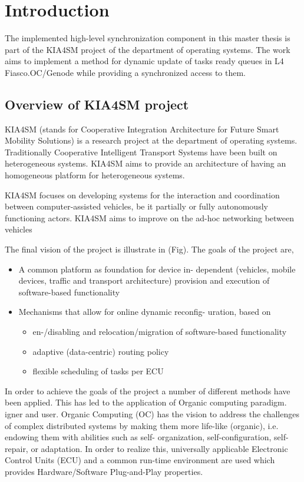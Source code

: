 \chapter{Introduction}
The implemented high-level synchronization component in this master thesis is part of the KIA4SM project of the department of operating systems. The work aims to implement a method for dynamic update of tasks ready queues in L4 Fiasco.OC/Genode while providing a synchronized access to them.



  

\section{Overview of KIA4SM project}

KIA4SM (stands for Cooperative Integration Architecture for Future Smart Mobility Solutions) is a research project at the department of operating systems. Traditionally Cooperative Intelligent Transport Systems have been built on heterogeneous systems. KIA4SM aims to provide an architecture of having an homogeneous platform for heterogeneous systems. 

KIA4SM focuses on developing systems for the interaction and coordination between computer-assisted vehicles, be it partially or fully autonomously functioning actors.  KIA4SM aims to improve on the ad-hoc networking between vehicles

The final vision of the project is illustrate in (Fig). The goals of the project are,

\begin{itemize}
\item A common platform as foundation for device in-
dependent (vehicles, mobile devices, traffic and
transport architecture) provision and execution of
software-based functionality
\item Mechanisms that allow for online dynamic reconfig-
uration, based on
\begin{itemize}
\item en-/disabling and relocation/migration of
software-based functionality
\item adaptive (data-centric) routing policy
\item flexible scheduling of tasks per ECU
\end{itemize}
\end{itemize}

In order to achieve the goals of the project a number of different methods have been applied. This has led to the application of Organic computing paradigm. igner and user.
Organic Computing (OC) has the vision to address the
challenges of complex distributed systems by making them more
life-like (organic), i.e. endowing them with abilities such as self-
organization, self-configuration, self-repair, or adaptation.
In order to realize this, universally applicable Electronic Control Units (ECU) and a common run-time environment are used which provides Hardware/Software Plug-and-Play properties.

